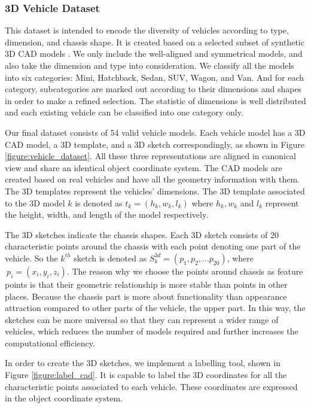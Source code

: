 \documentclass[a4paper,12pt]{article}
\begin{document}
\subsubsection{3D Vehicle Dataset}
\label{cad_models}
This dataset is intended to encode the diversity of vehicles according to type, dimension, and chassis shape. It is created based on a selected subset of synthetic 3D CAD models \cite{NIPS2012_4562}. We only include the well-aligned and  symmetrical models, and also take the dimension and type into consideration. We classify all the models into six categories: Mini, Hatchback, Sedan, SUV, Wagon, and Van. And for each category,  subcategories are marked out according to their dimensions and shapes in order to make a refined selection.  The statistic of dimensions is well distributed and each existing vehicle can be classified into one category only.


Our final dataset consists of 54 valid vehicle models. Each vehicle model has a 3D CAD model, a 3D template, and a 3D sketch correspondingly, as shown in Figure \ref{figure:vehicle_dataset}. All these three representations are aligned in canonical view and share an identical object coordinate system. The CAD models are created based on real vehicles and have all the geometry information with them. The 3D templates represent the vehicles' dimensions. The 3D template associated to the 3D model $k$ is denoted as $t_k = (h_k, w_k, l_k)$ where $h_k, w_k$ and $l_k$ represent the height, width, and length of the model respectively. 

The  3D sketches indicate the chassis shapes. Each 3D sketch consists of 20 characteristic points around the chassis with each point denoting one part of the vehicle. So the $k^{th}$ sketch is denoted as $S_k^{3d}  = (p_1, p_2, ... p_{20})$, where $~p_i = (x_i, y_i, z_i)$. The reason why we choose the points around chassis as feature points is that their geometric relationship is more stable than points in other places. Because the chassis part is more about functionality than appearance attraction compared to other parts of the vehicle,  \eg the upper part. In this way, the sketches can be more universal so that they can represent a wider range of vehicles, which reduces the number of models required and further increases the computational efficiency. 

In order to create the 3D sketches, we implement a labelling tool, shown in Figure \ref{figure:label_cad}. It is capable to label the 3D coordinates for all the characteristic points associated to each vehicle. These coordinates are expressed in the object coordinate system.
\end{document}
